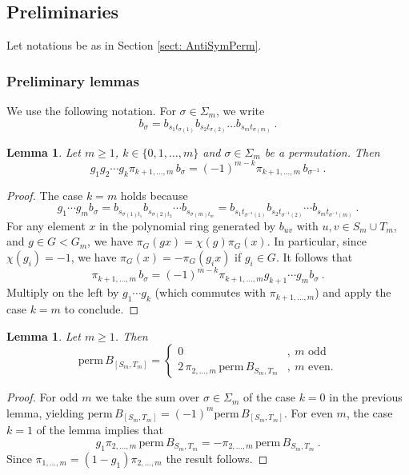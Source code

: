 \documentclass[10pt]{amsart}
\newcommand{\perm}{\mathrm{perm}\,}
\theoremstyle{plain}
\newtheorem{lem}[thm]{Lemma}
\newcommand{\0}{\color{blue}{\mathsf{0}}}
\begin{document}
\subsection{Preliminaries}
Let notations be as in Section \ref{sect: AntiSymPerm}.


\subsubsection{Preliminary lemmas}
We use the following notation. For $\sigma \in \Sigma_m$, we write
$$b_{\sigma} = b_{s_1t_{\sigma(1)}} b_{s_2t_{\sigma(2)}} \ldots  b_{s_mt_{\sigma(m)}} \ . $$

\begin{lem} \label{lem: cancellationsunderpi}  Let $m\geq1$, $k\in\{0,1,\ldots, m\}$
and $\sigma \in \Sigma_m $ be a permutation. Then
$$
g_1g_2\cdots g_k\pi_{k+1,\ldots,m} \, b_{\sigma}=(-1)^{m-k}\pi_{k+1,\ldots,m} \, b_{\sigma^{-1} }\ . $$
\end{lem} 

\begin{proof} The case $k=m$ holds because
\[   g_1\cdots g_m b_\sigma=
b_{ s_{\sigma(1)t_1 }}b_{ s_{\sigma(2)t_2}} \cdots b_{ s_{\sigma(m)t_m}} =b_{s_1t_{\sigma^{-1}(1)}}b_{s_2t_{\sigma^{-1}(2)}} \cdots b_{s_mt_{\sigma^{-1}(m)}} \ .\]
For any element $x$ in the polynomial ring generated by $b_{uv}$ with $u,v \in S_m \cup T_m$, and 
$g \in G<G_m$,  we have 
$\pi_G (gx) = \chi(g) \pi_G(x)$. In particular, since $\chi(g_i)=-1$, we have $\pi_G(x)=- \pi_G(g_ix)$ if $g_i\in G$. 
It follows that 
\[\pi_{k+1,\ldots,m}\, b_\sigma=
(-1)^{m-k}\pi_{k+1,\ldots,m}g_{k+1}\cdots g_mb_\sigma\ .\]
Multiply on the left by $g_1\cdots g_k$ (which commutes with $\pi_{k+1,\ldots,m}$) and apply the case $k=m$ to conclude.
\end{proof}

\begin{lem}\label{prelimlem2} Let $m\geq1$. Then
$$
\perm B_{[S_m,T_m]} =\left\{\begin{array}{cl}0&,\ m\text{ odd}\\
2\, \pi_{2,\ldots,m}\,\perm B_{S_m,T_m}&,\ m\text{ even.}\end{array}\right.
$$
\end{lem} 
\begin{proof} For odd $m$ we take the sum over $\sigma\in\Sigma_m$ of the case $k=0$ in the previous lemma, yielding $\perm B_{[S_m,T_m]}=(-1)^m \perm B_{[S_m,T_m]}$.
For even $m$, the case $k=1$ of the lemma implies that 
\[ g_1\pi_{2,\ldots,m}\,\perm B_{S_m,T_m}=-\pi_{2,\ldots,m}\,\perm B_{S_m,T_m}\ .  \]
Since $\pi_{1,\ldots,m}=(1-g_1)\pi_{2,\ldots,m}$ the result follows.
\end{proof}
\end{document}
